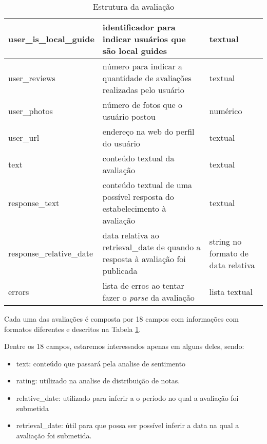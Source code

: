 \begin{table}[]
\begin{tabular}{|l|p{5cm}|p{5cm}|}
		\hline
		user\_is\_local\_guide    & identificador para indicar usuários que são local guides                        & textual                                                                        \\
		\hline
		user\_reviews             & número para indicar a quantidade de avaliações realizadas pelo usuário          & textual                                                                        \\
		\hline
		user\_photos              & número de fotos que o usuário postou                                            & numérico                                                                       \\
		\hline
		user\_url                 & endereço na web do perfil do usuário                                            & textual                                                                        \\
		\hline
		text                      & conteúdo textual da avaliação                                                   & textual                                                                        \\
		\hline
		response\_text            & conteúdo textual de uma possível resposta do estabelecimento à avaliação        & textual                                                                        \\
		\hline
		response\_relative\_date  & data relativa ao retrieval\_date de quando a resposta à avaliação foi publicada & string no formato de data relativa                                             \\
		\hline
		errors                    & lista de erros ao tentar fazer o \emph{parse} da avaliação                      & lista textual                                                                  \\
		\hline
	\end{tabular}
	\caption{Estrutura da avaliação}
	\label{tab:estrutura_review}
\end{table}

Cada uma das avaliações é composta por 18 campos com informações com formatos diferentes e descritos na Tabela \ref{tab:estrutura_review}.

Dentre os 18 campos, estaremos interessados apenas em alguns deles, sendo:

\begin{itemize}
	\item text: conteúdo que passará pela analise de sentimento
	\item rating: utilizado na analise de distribuição de notas.
	\item relative\_date: utilizado para inferir a o período no qual a avaliação foi submetida
	\item retrieval\_date: útil para que possa ser possível inferir a data na qual a avaliação foi submetida.
\end{itemize}

